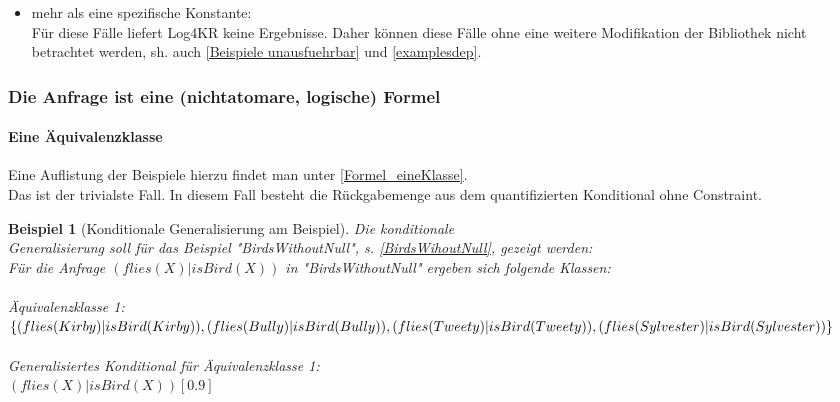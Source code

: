\documentclass[a4paper, 11pt]{book}
\newtheorem{Bsp}{Beispiel}[section]
\begin{document}
\begin{itemize}
\begin{itemize}
\begin{itemize}
			\item mehr als eine spezifische Konstante:\\
			Für diese Fälle liefert Log4KR  keine Ergebnisse. Daher können diese Fälle ohne eine weitere Modifikation der Bibliothek nicht betrachtet werden, sh. auch \ref{Beispiele unausfuehrbar} und \ref{examplesdep}.
		\end{itemize}
	\end{itemize}
\end{itemize}


\subsubsection{Die Anfrage ist eine (nichtatomare, logische) Formel} \label{KondGen_Formel}
\paragraph{Eine Äquivalenzklasse}
Eine Auflistung der Beispiele hierzu findet man unter \ref{Formel_eineKlasse}.\\
Das ist der trivialste Fall. In diesem Fall besteht die Rückgabemenge aus dem quantifizierten Konditional ohne Constraint.
	\begin{Bsp}[Konditionale Generalisierung am Beispiel]
	Die konditionale \\ Generalisierung soll für das Beispiel  "{}BirdsWithoutNull"{}, s. \ref{BirdsWihoutNull}, gezeigt werden:\\
	Für die Anfrage $ (flies(X) | isBird(X))$ in "{}BirdsWithoutNull"{} ergeben sich folgende Klassen:\\
	\\
	Äquivalenzklasse 1: $ \{(flies(Kirby) | isBird(Kirby)), (flies(Bully) | isBird(Bully)),\\ (flies(Tweety) | isBird(Tweety)), (flies(Sylvester) | isBird(Sylvester))\} $\\
	\\
	Generalisiertes Konditional für Äquivalenzklasse 1:\\ $ (flies(X) | isBird(X))[0.9]$
\end{Bsp}
\end{document}
